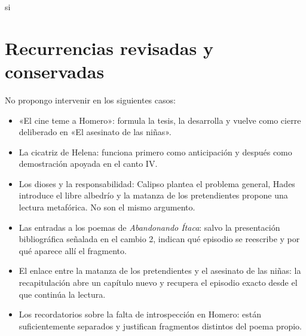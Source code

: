 \documentclass[12pt,a4paper]{article}
\newcounter{cambio}
\begin{document}
si
\section*{Recurrencias revisadas y conservadas}

No propongo intervenir en los siguientes casos:

\begin{itemize}[leftmargin=*]
  \item «El cine teme a Homero»: formula la tesis, la desarrolla y vuelve como cierre deliberado en «El asesinato de las niñas».
  \item La cicatriz de Helena: funciona primero como anticipación y después como demostración apoyada en el canto IV.
  \item Los dioses y la responsabilidad: Calipso plantea el problema general, Hades introduce el libre albedrío y la matanza de los pretendientes propone una lectura metafórica. No son el mismo argumento.
  \item Las entradas a los poemas de \emph{Abandonando Ítaca}: salvo la presentación bibliográfica señalada en el cambio 2, indican qué episodio se reescribe y por qué aparece allí el fragmento.
  \item El enlace entre la matanza de los pretendientes y el asesinato de las niñas: la recapitulación abre un capítulo nuevo y recupera el episodio exacto desde el que continúa la lectura.
  \item Los recordatorios sobre la falta de introspección en Homero: están suficientemente separados y justifican fragmentos distintos del poema propio.
\end{itemize}
\end{document}
